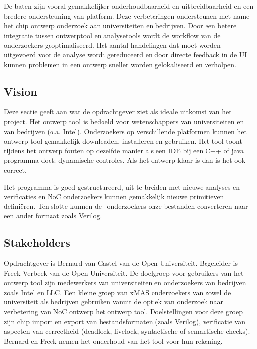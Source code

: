 De baten zijn vooral gemakkelijker onderhoudbaarheid en uitbreidbaarheid en een bredere ondersteuning van platform.
Deze verbeteringen ondersteunen met name het chip ontwerp onderzoek aan universiteiten en bedrijven. Door een betere integratie
tussen ontwerptool en analysetools wordt de workflow van de onderzoekers geoptimaliseerd. Het aantal handelingen
dat moet worden uitgevoerd voor de analyse wordt gereduceerd en door directe feedback in de UI kunnen problemen in een ontwerp
sneller worden gelokaliseerd en verholpen.


\subsection{Vision}\label{sec: vision}

Deze sectie geeft aan wat de opdrachtgever ziet als ideale uitkomst van het project. Het ontwerp tool is
bedoeld voor wetenschappers van universiteiten en van bedrijven (o.a. Intel). Onderzoekers op verschillende
platformen kunnen het ontwerp tool gemakkelijk downloaden, installeren en gebruiken. Het tool toont tijdens
het ontwerp fouten op dezelfde manier als een IDE bij een C++ of java programma doet: dynamische controles.
Als het ontwerp klaar is dan is het ook correct.

Het programma is goed gestructureerd, uit te breiden met nieuwe analyses en verificaties en NoC onderzoekers
kunnen gemakkelijk nieuwe primitieven defini\"eren. Ten slotte kunnen de \xmas\ onderzoekers onze bestanden
converteren naar een ander formaat zoals Verilog.

\subsection{Stakeholders}

Opdrachtgever is Bernard van Gastel van de Open Universiteit. Begeleider is Freek Verbeek van de Open Universiteit.
De doelgroep voor gebruikers van het ontwerp tool zijn medewerkers van universiteiten en onderzoekers van bedrijven zoals
Intel en LLC. Een kleine groep van xMAS onderzoekers van zowel de universiteit als bedrijven gebruiken vanuit de optiek
van onderzoek naar verbetering van NoC ontwerp het ontwerp tool. Doelstellingen voor deze groep zijn chip import
en export van bestandsformaten (zoals Verilog), verificatie van aspecten van correctheid (deadlock, livelock,
syntactische of semantische checks). Bernard en Freek nemen het onderhoud van het tool voor hun rekening.


